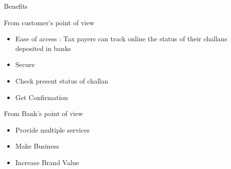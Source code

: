 \documentclass{beamer}
\begin{document}
\begin{frame}{Benefits}

\begin{block}{From customer’s point of view}
\end{block}
\begin{itemize}

\item Ease of access : Tax payers can track online the status of their challans deposited in banks
\item Secure
  \item Check present status of challan
  \item Get Confirmation

\end{itemize}

\begin{block}{From Bank’s point of view}
\end{block}
\begin{itemize}

\item Provide multiple services
\item Make Business
\item Increase Brand Value
\end{itemize}

\vskip 1cm
\end{frame}

\end{document}
